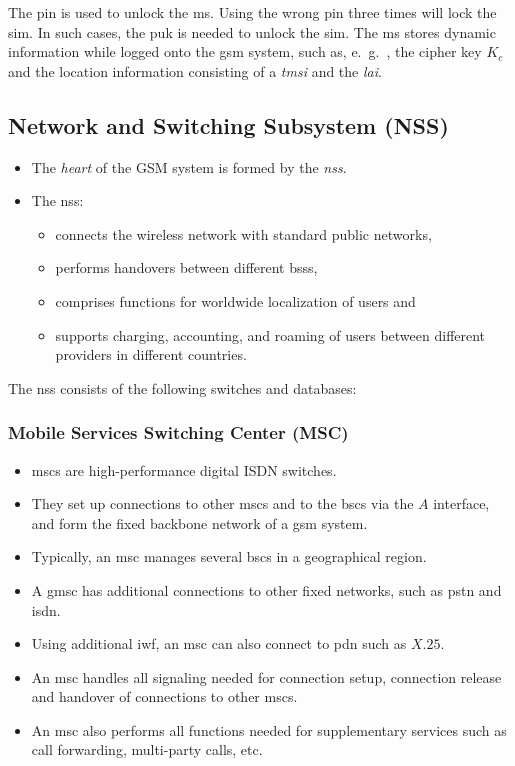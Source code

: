 The \gls{pin} is used to unlock the \gls{ms}. Using the wrong \gls{pin} three times will lock the \gls{sim}. In such cases, the \gls{puk} is needed to unlock the \gls{sim}. The \gls{ms} stores dynamic information while logged onto the \gls{gsm} system, such as, e.\ g.\ , the cipher key $ K_c $ and the location information consisting of a \textit{\gls{tmsi}} and the \textit{\gls{lai}}.


\subsection[NSS]{Network and Switching Subsystem (NSS)}
\begin{itemize}
	\item The \textit{heart} of the GSM system is formed by the \textit{\gls{nss}}.
	\item The \gls{nss}: 
	\begin{itemize}
		\item connects the wireless network with standard public networks, 
		\item performs handovers between different \gls{bss}s, 
		\item comprises functions for worldwide localization of users and 
		\item supports charging, accounting, and roaming of users between different providers in different countries. 
	\end{itemize}
\end{itemize}

The \gls{nss} consists of the following switches and databases:

\subsubsection[MSC]{Mobile Services Switching Center (MSC)}
\begin{itemize}
	\item \gls{msc}s are high-performance digital ISDN switches. 
	\item They set up connections to other \gls{msc}s and to the \gls{bsc}s via the \(A\) interface, and form the fixed backbone network of a \gls{gsm} system. 
	\item Typically, an \gls{msc} manages several \gls{bsc}s in a geographical region. 
	\item A \gls{gmsc} has additional connections to other fixed networks, such as \gls{pstn} and \gls{isdn}. 
	\item Using additional \gls{iwf}, an \gls{msc} can also connect to \gls{pdn} such as \(X.25\). 
	\item An \gls{msc} handles all signaling needed for connection setup, connection release and handover of connections to other \gls{msc}s. 
	\item An \gls{msc} also performs all functions needed for supplementary services such as call forwarding, multi-party calls, etc.
\end{itemize}


